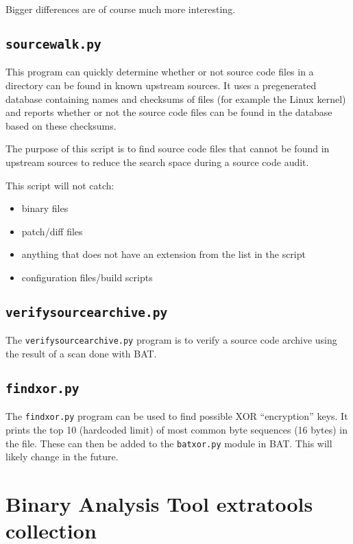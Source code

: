 \documentclass[10pt,a4paper]{article}
\begin{document}
Bigger differences are of course much more interesting.

\subsection{\texttt{sourcewalk.py}}

This program can quickly determine whether or not source code files in a
directory can be found in known upstream sources. It uses a pregenerated
database containing names and checksums of files (for example the Linux kernel)
and reports whether or not the source code files can be found in the database
based on these checksums.

The purpose of this script is to find source code files that cannot be found in
upstream sources to reduce the search space during a source code audit.

This script will not catch:

\begin{itemize}
\item binary files
\item patch/diff files
\item anything that does not have an extension from the list in the script
\item configuration files/build scripts
\end{itemize}

\subsection{\texttt{verifysourcearchive.py}}

The \texttt{verifysourcearchive.py} program is to verify a source code archive
using the result of a scan done with BAT.

\subsection{\texttt{findxor.py}}

The \texttt{findxor.py} program can be used to find possible XOR ``encryption''
keys. It prints the top 10 (hardcoded limit) of most common byte sequences (16
bytes) in the file. These can then be added to the \texttt{batxor.py} module in
BAT. This will likely change in the future.

\section{Binary Analysis Tool extratools collection}
\end{document}
